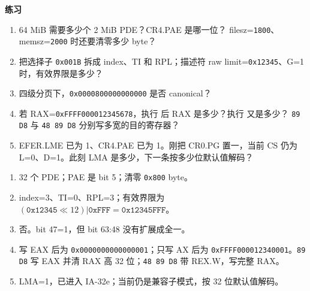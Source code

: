 \textbf{练习}
\begin{enumerate}[leftmargin=2.2em]
  \item 64 MiB 需要多少个 2 MiB PDE？CR4.PAE 是哪一位？
    filesz=\texttt{1800}、memsz=\texttt{2000} 时还要清零多少 byte？
  \item 把选择子 \texttt{0x001B} 拆成 index、TI 和 RPL；描述符 raw
    limit=\texttt{0x12345}、G=1 时，有效界限是多少？
  \item 四级分页下，\texttt{0x0000800000000000} 是否 canonical？
  \item 若 RAX=\texttt{0xFFFF000012345678}，执行
     后 RAX 是多少？执行  又是多少？
    \texttt{89 D8} 与 \texttt{48 89 D8} 分别写多宽的目的寄存器？
  \item EFER.LME 已为 1、CR4.PAE 已为 1。刚把 CR0.PG 置一，当前
    CS 仍为 L=0、D=1。此刻 LMA 是多少，下一条按多少位默认值解码？
\end{enumerate}
\begin{answerbox}
\begin{enumerate}[leftmargin=2.2em]
  \item 32 个 PDE；PAE 是 bit 5；清零 \texttt{0x800} byte。
  \item index=3、TI=0、RPL=3；有效界限为
    \((\texttt{0x12345}\ll12)|\texttt{0xFFF}
    =\texttt{0x12345FFF}\)。
  \item 否。bit 47=1，但 bit 63:48 没有扩展成全一。
  \item 写 EAX 后为 \texttt{0x0000000000000001}；只写 AX 后为
    \texttt{0xFFFF000012340001}。\texttt{89 D8} 写 EAX 并清 RAX
    高 32 位；\texttt{48 89 D8} 带 REX.W，写完整 RAX。
  \item LMA=1，已进入 IA-32e；当前仍是兼容子模式，按 32 位默认值解码。
\end{enumerate}
\end{answerbox}
